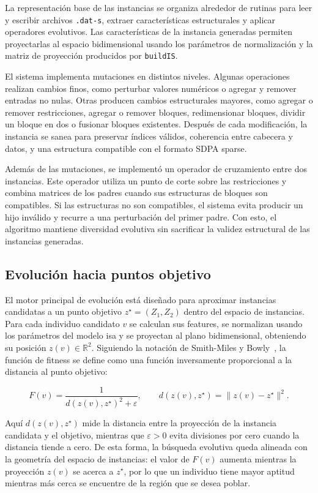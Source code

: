 La representación base de las instancias se organiza alrededor de rutinas para leer y
escribir archivos \texttt{.dat-s}, extraer características estructurales y aplicar
operadores evolutivos.
Las características de la instancia generadas permiten
proyectarlas al espacio bidimensional usando los parámetros de normalización y la
matriz de proyección producidos por \texttt{buildIS}.

El sistema implementa mutaciones en distintos niveles.
Algunas operaciones realizan cambios finos, como perturbar valores numéricos o
agregar y remover entradas no nulas.
Otras producen cambios estructurales mayores, como agregar o remover restricciones,
agregar o remover bloques, redimensionar bloques, dividir un bloque en dos o fusionar
bloques existentes.
Después de cada modificación, la instancia se sanea para preservar índices válidos,
coherencia entre cabecera y datos, y una estructura compatible con el formato SDPA
sparse.

Además de las mutaciones, se implementó un operador de cruzamiento entre dos
instancias.
Este operador utiliza un punto de corte sobre las restricciones y combina matrices de
los padres cuando sus estructuras de bloques son compatibles.
Si las estructuras no son compatibles, el sistema evita producir un hijo inválido y
recurre a una perturbación del primer padre.
Con esto, el algoritmo mantiene diversidad evolutiva sin sacrificar la validez
estructural de las instancias generadas.

\newpage
\subsection{Evolución hacia puntos objetivo}
\label{subsec:avance_ga_puntos_objetivo}

El motor principal de evolución está diseñado para aproximar instancias candidatas a
un punto objetivo $z^\star=(Z_1,Z_2)$ dentro del espacio de instancias.
Para cada individuo candidato $v$ se calculan sus features, se normalizan usando los
parámetros del modelo \acrshort{isa} y se proyectan al plano bidimensional, obteniendo
su posición $z(v)\in\mathbb{R}^2$.
Siguiendo la notación de Smith-Miles y Bowly~\cite{smith-milesGeneratingNewTest2015},
la función de fitness se define como una función inversamente proporcional a la
distancia al punto objetivo:

\[
    F(v) = \frac{1}{d(z(v),z^\star)^2 + \varepsilon},
    \qquad
    d(z(v),z^\star)=\|z(v)-z^\star\|^2.
\]

Aquí $d(z(v),z^\star)$ mide la distancia entre la proyección de la instancia candidata
y el objetivo, mientras que $\varepsilon>0$ evita divisiones por cero cuando la
distancia tiende a cero.
De esta forma, la búsqueda evolutiva queda alineada con la geometría del espacio de
instancias: el valor de $F(v)$ aumenta mientras la proyección $z(v)$ se acerca a
$z^\star$, por lo que un individuo tiene mayor aptitud mientras más cerca se encuentre
de la región que se desea poblar.

